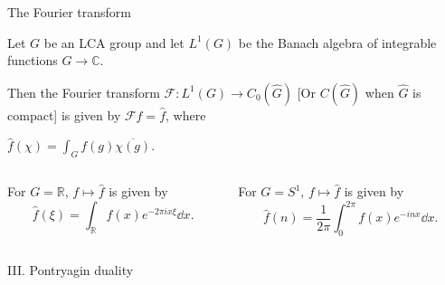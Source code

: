 \documentclass[mathserif
]{beamer}
\begin{document}
\begin{frame}{The Fourier transform}
    \begin{definition}
        Let $G$ be an LCA group and let $L^1(G)$ be the Banach algebra of integrable functions $G\to \mathbb{C}$. \pause 

        Then the Fourier transform $\mathcal{F} \colon L^1(G)\to C_0(\widehat{\hspace{0pt}G})$ [Or $C(\widehat{\hspace{0pt}G})$ when $\widehat{\hspace{0pt}G}$ is compact] is given by $\mathcal{F}f =\hat{f}$, where \begin{center}
            $\hat{f}(\chi) = \int_G f(g)\overline{\chi(g)}$.
        \end{center}
    \end{definition}
    \pause
    \vspace{1em}
    \begin{columns}
        \begin{column}{0.46\linewidth}
            For $G= \mathbb{R}$, $f\mapsto \hat{f}$ is given by \[\hat{f}(\xi) = \int_{\mathbb{R}}f(x)e^{-2\pi i x\xi}\dd{x}.\]
        \end{column}\pause \begin{column}{0.46\linewidth}
           For $G = S^1$, $f\mapsto\hat{f}$ is given by \[\hat{f}(n) = \frac{1}{2\pi}\int_{0}^{2\pi}f(x)e^{- in x}\dd{x}.\] 
        \end{column}
    \end{columns}
\end{frame}

\begin{frame}{}
    \begin{block}{}{
        \begin{center}\Large III. Pontryagin duality\end{center}}
    \end{block}
\end{frame}
\end{document}
